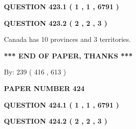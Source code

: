 \documentclass[12pt]{article}
\begin{document}
{\textbf{\Large{QUESTION
423.1 
 ( 1 , 1 , 6791 )
}}}
  
  
  
\vspace{0.2in}
  
{\textbf{\Large{QUESTION
423.2 
 ( 2 , 2 , 3 )
}}}
  
  
 
 
\noindent{}
 
 
Canada has 10  provinces and 3 territories.
 
 
 
 
   
   
 \vspace{0.2in}
 
   
   
   
   
\vspace{1.0in} 
{\textbf{\large{ *** END OF PAPER, THANKS *** }}} 
   
   
\hspace{1.0in} By: 
 239 ( 416 ,  613 )
   
   
   
   
\newpage 
\setcounter{page}{ 
   424001 } 
   
   
   
   
 {\textbf{ \Large{ PAPER NUMBER  424  }}}
   
   
\vspace{0.2in}
   
   
   
   
   
   
 \vspace{0.2in}
 
 
 
 
   
   
  
\vspace{0.2in}
  
{\textbf{\Large{QUESTION
424.1 
 ( 1 , 1 , 6791 )
}}}
  
  
  
\vspace{0.2in}
  
{\textbf{\Large{QUESTION
424.2 
 ( 2 , 2 , 3 )
}}}
  
  
 
 
\noindent{}
 
\end{document}
